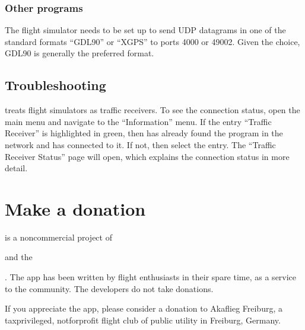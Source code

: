 \documentclass[letterpaper,10pt,english]{sphinxmanual}
\begin{document}
\noindent{}


\subsection{Other programs}
\label{\detokenize{02-steps/simulator:other-programs}}
\sphinxAtStartPar
The flight simulator needs to be set up to send UDP datagrams in one of the
standard formats “GDL90” or “XGPS” to ports 4000 or 49002.  Given the choice,
GDL90 is generally the preferred format.


\section{Troubleshooting}
\label{\detokenize{02-steps/simulator:troubleshooting}}
\sphinxAtStartPar
{} treats flight simulators as traffic receivers.  To
see the connection status, open the main menu and navigate to the “Information”
menu.  If the entry “Traffic Receiver” is highlighted in green, then  has already found the program in the network and has
connected to it.  If not, then select the entry. The “Traffic Receiver Status”
page will open, which explains the connection status in more detail.


\chapter{Make a donation}
\label{\detokenize{02-steps/donate:make-a-donation}}\label{\detokenize{02-steps/donate::doc}}
\sphinxAtStartPar
{} is a non\sphinxhyphen{}commercial project of %
\begin{footnote}[20]\sphinxAtStartFootnote
{}
%
\end{footnote} and the %
\begin{footnote}[21]\sphinxAtStartFootnote
{}
%
\end{footnote}. The app has been written by flight enthusiasts
in their spare time, as a service to the community. The developers do not take
donations.

\sphinxAtStartPar
If you appreciate the app, please consider a donation to Akaflieg Freiburg, a
tax\sphinxhyphen{}privileged, not\sphinxhyphen{}for\sphinxhyphen{}profit flight club of public utility in Freiburg,
Germany.
\end{document}
